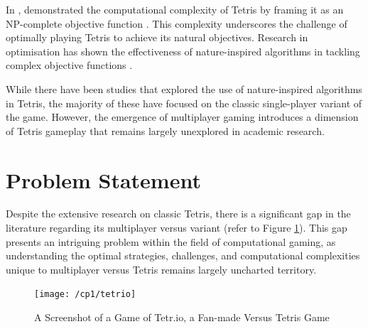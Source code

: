 \documentclass[a4paper, 12pt]{extreport}
\begin{document}
			
	 		
	 		In \citeyear{tetris-is-hard-even-to-approx}, \citeauthor{tetris-is-hard-even-to-approx} demonstrated the computational complexity of Tetris by framing it as an NP-complete objective function \cite{tetris-is-hard-even-to-approx}. This complexity underscores the challenge of optimally playing Tetris to achieve its natural objectives. Research in optimisation has shown the effectiveness of nature-inspired algorithms in tackling complex objective functions \cite{classical-nia-for-optimisation}.
	 		
	 		While there have been studies that explored the use of nature-inspired algorithms in Tetris, the majority of these have focused on the classic single-player variant of the game. However, the emergence of multiplayer gaming introduces a dimension of Tetris gameplay that remains largely unexplored in academic research.
		
		\section{Problem Statement}
			
			
			Despite the extensive research on classic Tetris, there is a significant gap in the literature regarding its multiplayer versus variant (refer to Figure \ref{tetrio}). This gap presents an intriguing problem within the field of computational gaming, as understanding the optimal strategies, challenges, and computational complexities unique to multiplayer versus Tetris remains largely uncharted territory.
			
			\begin{figure}
				\texttt{[image: /cp1/tetrio]}
				\caption{A Screenshot of a Game of Tetr.io, a Fan-made Versus Tetris Game}
				\label{tetrio}
			\end{figure}
		
\end{document}
